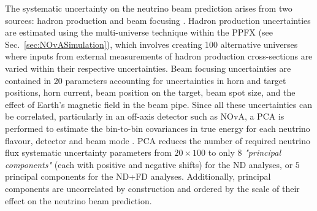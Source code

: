 

The systematic uncertainty on the neutrino beam prediction arises from two sources: hadron production and beam focusing \cite{NuMIFlux.pdf}. Hadron production uncertainties are estimated using the multi-universe technique within the \gls{PPFX} (see Sec.~\ref{sec:NOvASimulation}), which involves creating 100 alternative universes where inputs from external measurements of hadron production cross-sections are varied within their respective uncertainties. Beam focusing uncertainties are contained in 20 parameters accounting for uncertainties in horn and target positions, horn current, beam position on the target, beam spot size, and the effect of Earth's magnetic field in the beam pipe. Since all these uncertainties can be correlated, particularly in an off-axis detector such as \gls{NOvA}, a \gls{PCA} is performed to estimate the bin-to-bin covariances in true energy for each neutrino flavour, detector and beam mode \cite{NitishOscMeasuremetPCAStatisticalAna2021.pdf}. \gls{PCA} reduces the number of required neutrino flux systematic uncertainty parameters from $20\times100$ to only $8$ \textit{"principal components"} (each with positive and negative shifts) for the \gls{ND} analyses, or $5$ principal components for the \gls{ND}+\gls{FD} analyses. Additionally, principal components are uncorrelated by construction and ordered by the scale of their effect on the neutrino beam prediction.

